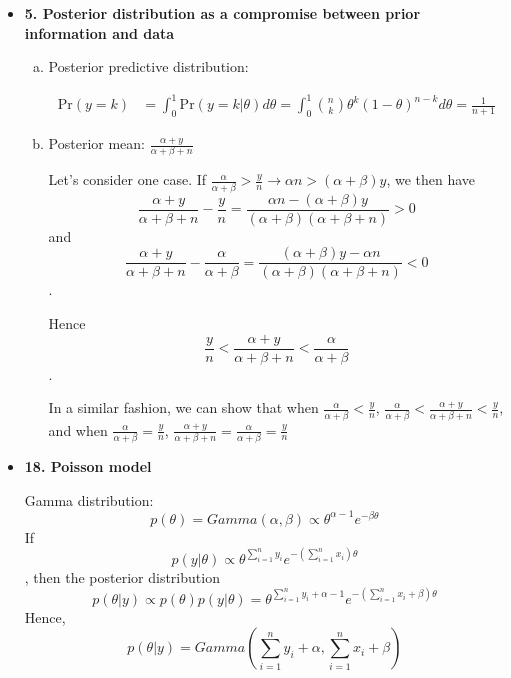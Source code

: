 \documentclass{article}
\begin{document}
\begin{itemize}
\item \textbf{5. Posterior distribution as a compromise between prior information and data}

\begin{enumerate}[(a)]

\item Posterior predictive distribution:

\begin{align}
\text{Pr}(y=k) &= \int_0^1 \text{Pr}(y=k|\theta) d\theta = \int_0^1 \binom{n}{k} \theta^k (1-\theta)^{n-k} d\theta = \frac{1}{n+1}
\end{align}

\item Posterior mean:
$
\frac{\alpha + y}{\alpha + \beta + n}
$

Let's consider one case. If $\frac{\alpha}{\alpha + \beta} > \frac{y}{n} \rightarrow \alpha n > (\alpha+\beta)y$, we then have
$$
\frac{\alpha+y}{\alpha+\beta+n} - \frac{y}{n} = \frac{\alpha n -(\alpha+\beta)y}{(\alpha + \beta)(\alpha + \beta+n)} > 0
$$
and 
$$
\frac{\alpha+y}{\alpha+\beta+n} - \frac{\alpha}{\alpha + \beta} = \frac{(\alpha+\beta)y - \alpha n}{(\alpha + \beta)(\alpha + \beta+n)} < 0
$$.

Hence
$$\frac{y}{n} <\frac{\alpha+y}{\alpha + \beta+n} < \frac{\alpha}{\alpha + \beta}$$.

In a similar fashion, we can show that when $\frac{\alpha}{\alpha + \beta} < \frac{y}{n}$, $\frac{\alpha}{\alpha + \beta} <  \frac{\alpha+y}{\alpha + \beta+n} < \frac{y}{n}$, and when $\frac{\alpha}{\alpha + \beta} = \frac{y}{n}$, $\frac{\alpha+y}{\alpha + \beta+n} = \frac{\alpha}{\alpha + \beta} = \frac{y}{n}$

\end{enumerate}

\item \textbf{18. Poisson model}

Gamma distribution:
$$
p(\theta) = Gamma (\alpha, \beta) \propto \theta^{\alpha - 1} e^{-\beta \theta}
$$
If 
$$
p(y|\theta) \propto \theta^{\sum_{i=1}^n y_i} e^{-(\sum_{i=1}^nx_i)\theta}
$$,
then the posterior distribution
$$
p(\theta|y) \propto p(\theta)p(y|\theta) = \theta^{\sum_{i=1}^n y_i + \alpha - 1} e^{-(\sum_{i=1}^n x_i+\beta)\theta}
$$
Hence, $$p(\theta|y) = Gamma(\sum_{i=1}^n y_i + \alpha, \sum_{i=1}^n x_i+\beta)$$


\end{itemize}
\end{document}
